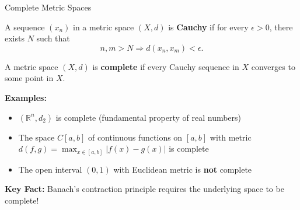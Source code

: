 \documentclass[aspectratio=169,10pt]{beamer}
\begin{document}
\begin{frame}[fragile]{Complete Metric Spaces}
    \begin{definition}
        A sequence $(x_n)$ in a metric space $(X, d)$ is \textbf{Cauchy} if for every $\epsilon > 0$, there exists $N$ such that
        \[
            n, m > N \Rightarrow d(x_n, x_m) < \epsilon.
        \]
    \end{definition}

    \vspace{0.3cm}
    \begin{definition}
        A metric space $(X, d)$ is \textbf{complete} if every Cauchy sequence in $X$ converges to some point in $X$.
    \end{definition}

    \vspace{0.4cm}
    \textbf{Examples:}
    \begin{itemize}
        \item $(\mathbb{R}^n, d_2)$ is complete (fundamental property of real numbers)
        \item The space $C[a,b]$ of continuous functions on $[a,b]$ with metric $d(f,g) = \max_{x \in [a,b]} |f(x) - g(x)|$ is complete
        \item The open interval $(0,1)$ with Euclidean metric is \textbf{not} complete
    \end{itemize}

    \vspace{0.3cm}
    \textbf{Key Fact:} Banach's contraction principle requires the underlying space to be complete!
\end{frame}
\end{document}
